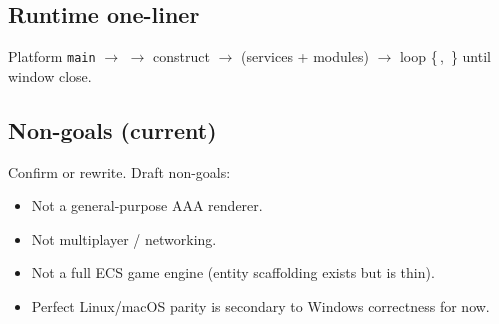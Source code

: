 \subsection{Runtime one-liner}
Platform \texttt{main} $\rightarrow$  $\rightarrow$ construct
 $\rightarrow$  (services + modules) $\rightarrow$
loop \{\,, \,\} until window close.

\subsection{Non-goals (current)}
\begin{openbox}
Confirm or rewrite. Draft non-goals:
\begin{itemize}
  \item Not a general-purpose AAA renderer.
  \item Not multiplayer / networking.
  \item Not a full ECS game engine (entity scaffolding exists but is thin).
  \item Perfect Linux/macOS parity is secondary to Windows correctness for now.
\end{itemize}
\end{openbox}
